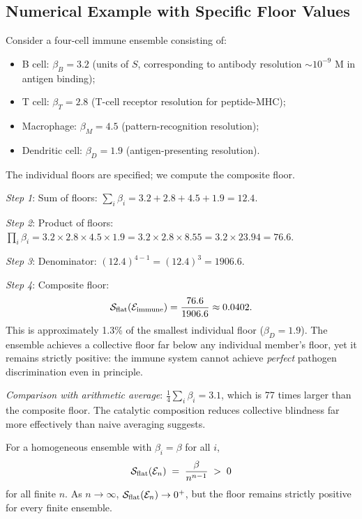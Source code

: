 \subsection{Numerical Example with Specific Floor Values}

\begin{example}
\label{ex:immune-floor-concrete}
Consider a four-cell immune ensemble consisting of:
\begin{itemize}[leftmargin=2em]
  \item B cell: $\beta_B = 3.2$ (units of $S$, corresponding to antibody
    resolution $\sim 10^{-9}$ M in antigen binding);
  \item T cell: $\beta_T = 2.8$ (T-cell receptor resolution for peptide-MHC);
  \item Macrophage: $\beta_M = 4.5$ (pattern-recognition resolution);
  \item Dendritic cell: $\beta_D = 1.9$ (antigen-presenting resolution).
\end{itemize}
The individual floors are specified; we compute the composite floor.

\noindent\textit{Step 1}: Sum of floors:
$\sum_i \beta_i = 3.2 + 2.8 + 4.5 + 1.9 = 12.4$.

\noindent\textit{Step 2}: Product of floors:
$\prod_i \beta_i = 3.2 \times 2.8 \times 4.5 \times 1.9
= 3.2 \times 2.8 \times 8.55 = 3.2 \times 23.94 = 76.6$.

\noindent\textit{Step 3}: Denominator: $(12.4)^{4-1} = (12.4)^3 = 1906.6$.

\noindent\textit{Step 4}: Composite floor:
\[
  \mathcal{S}_{\mathrm{flat}}(\mathcal{E}_{\mathrm{immune}})
  = \frac{76.6}{1906.6}
  \approx 0.0402.
\]
This is approximately 1.3\% of the smallest individual floor ($\beta_D = 1.9$).
The ensemble achieves a collective floor far below any individual member's floor,
yet it remains strictly positive: the immune system cannot achieve
\emph{perfect} pathogen discrimination even in principle.

\noindent\textit{Comparison with arithmetic average}:
$\frac{1}{4}\sum_i \beta_i = 3.1$, which is 77 times larger than the
composite floor.  The catalytic composition reduces collective blindness far
more effectively than naive averaging suggests.
\end{example}

\begin{theorem}
\label{thm:asymptotic-floor}
For a homogeneous ensemble with $\beta_i = \beta$ for all $i$,
\[
  \mathcal{S}_{\mathrm{flat}}(\mathcal{E}_n) \;=\; \frac{\beta}{n^{n-1}} \;>\; 0
\]
for all finite $n$.  As $n \to \infty$, $\mathcal{S}_{\mathrm{flat}}(\mathcal{E}_n) \to 0^+$,
but the floor remains strictly positive for every finite ensemble.
\end{theorem}

